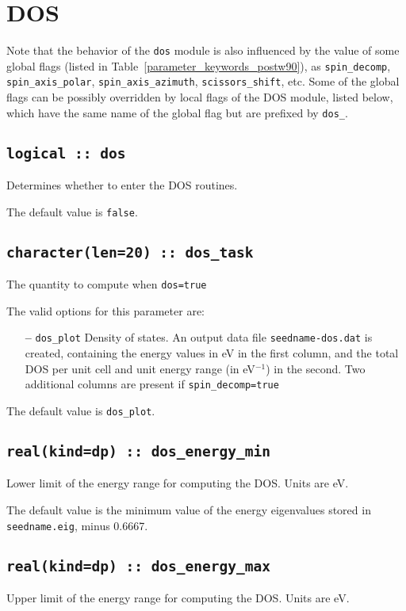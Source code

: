\clearpage
\section{DOS}
Note that the behavior of the \verb#dos# module  is also influenced by
the value of some global flags (listed in
Table~\ref{parameter_keywords_postw90}), as
\verb#spin_decomp#, \verb#spin_axis_polar#, \verb#spin_axis_azimuth#,
\verb#scissors_shift#, etc.
Some of the global flags can be possibly
overridden by local flags of the DOS module, listed below, which have
the same name of the global flag but are prefixed by \verb#dos_#.

\subsection[dos]{\tt logical :: dos}
Determines whether to enter the DOS routines.

The default value is \verb#false#.


\subsection[dos\_task]{\tt character(len=20) ::  dos\_task}
The quantity to compute when {\tt dos=true}

The valid options for this parameter are:
\begin{itemize}
\item[{\bf --}] \verb#dos_plot# Density of states. An output data file
  {\tt seedname-dos.dat} is created, containing the energy values in
  eV in the first column, and the total DOS per unit cell and unit
  energy range (in eV$^{-1}$) in the second. Two additional columns
  are present if {\tt spin\_decomp=true}
\end{itemize}


The default value is \verb#dos_plot#.


\subsection[dos\_min\_energy]{\tt real(kind=dp) :: dos\_energy\_min}
Lower limit of the energy range for computing the DOS.
Units are eV.

The default value is the minimum value of the energy eigenvalues
stored in {\tt seedname.eig}, minus 0.6667.

\subsection[dos\_max\_energy]{\tt real(kind=dp) :: dos\_energy\_max}
Upper limit of the energy range for computing the DOS.
Units are eV.

